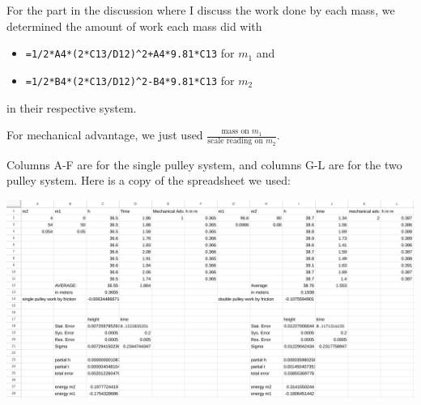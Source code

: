 \documentclass[12pt]{article}
\begin{document}
For the part in the discussion where I discuss the work done by each mass, we determined the amount of work each mass did with

\begin{itemize}
\item \verb|=1/2*A4*(2*C13/D12)^2+A4*9.81*C13| for \(m_1\) and
\item \verb|=1/2*B4*(2*C13/D12)^2-B4*9.81*C13| for \(m_2\)
\end{itemize}

in their respective system.

For mechanical advantage, we just used \(\frac{\text{mass on }m_1}{\text{scale reading on }m_2}\).

Columns A-F are for the single pulley system, and columns G-L are for the two pulley system. Here is a copy of the spreadsheet we used:

\begin{center}
\includegraphics[width=6.5in]{./spreadsheet.png}
\end{center}
\end{document}
